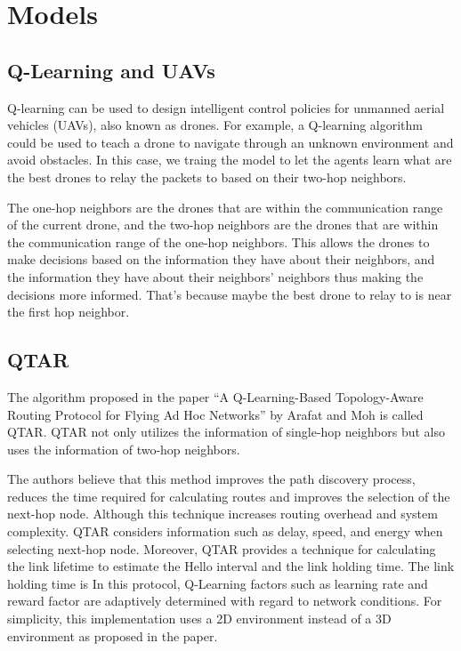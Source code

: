\section{Models}

\subsection{Q-Learning and UAVs}
Q-learning can be used to design intelligent control policies for unmanned aerial vehicles (UAVs), also known as drones.
For example, a Q-learning algorithm could be used to teach a drone to navigate through an unknown environment and avoid obstacles.
In this case, we traing the model to let the agents learn what are the best drones to relay the packets to based on their two-hop neighbors.

The one-hop neighbors are the drones that are within the communication range of the current drone, and the two-hop neighbors are the
drones that are within the communication range of the one-hop neighbors. This allows the drones to make decisions based on the information
they have about their neighbors, and the information they have about their neighbors' neighbors thus making the decisions more informed.
That's because maybe the best drone to relay to is near the first hop neighbor.

\subsection{QTAR}
The algorithm proposed in the paper ``A Q-Learning-Based Topology-Aware Routing Protocol for Flying Ad Hoc Networks'' by Arafat and Moh is called QTAR.
QTAR not only utilizes the information of single-hop neighbors
but also uses the information of two-hop neighbors.

The authors believe that this method improves the path discovery process,
reduces the time required for calculating routes and improves the selection of the next-hop node.
Although this technique increases routing overhead and system complexity.
QTAR considers information such as delay, speed, and energy when selecting next-hop node. Moreover, QTAR provides a technique for calculating
the link lifetime to estimate the Hello interval and the link holding time. The link holding time is
In this protocol, Q-Learning factors such as learning rate and reward factor are
adaptively determined with regard to network conditions.
For simplicity, this implementation uses a 2D environment instead of a 3D environment as proposed in the paper.

